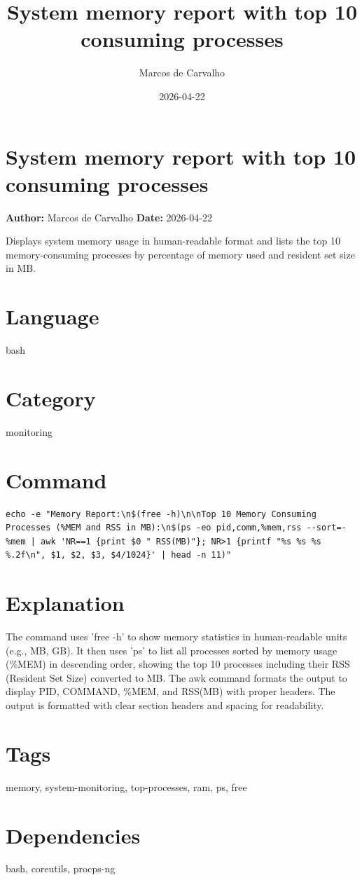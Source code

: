 \documentclass{article}
\title{System memory report with top 10 consuming processes}
\author{Marcos de Carvalho}
\date{2026-04-22}
\begin{document}
\section*{System memory report with top 10 consuming processes}
\textbf{Author:} Marcos de Carvalho \hfill \textbf{Date:} 2026-04-22

\noindent Displays system memory usage in human-readable format and lists the top 10 memory-consuming processes by percentage of memory used and resident set size in MB.

\section*{Language}
bash

\section*{Category}
monitoring

\section*{Command}
\begin{lstlisting}
echo -e "Memory Report:\n$(free -h)\n\nTop 10 Memory Consuming Processes (%MEM and RSS in MB):\n$(ps -eo pid,comm,%mem,rss --sort=-%mem | awk 'NR==1 {print $0 " RSS(MB)"}; NR>1 {printf "%s %s %s %.2f\n", $1, $2, $3, $4/1024}' | head -n 11)"
\end{lstlisting}

\section*{Explanation}
The command uses 'free -h' to show memory statistics in human-readable units (e.g., MB, GB). It then uses 'ps' to list all processes sorted by memory usage (\%MEM) in descending order, showing the top 10 processes including their RSS (Resident Set Size) converted to MB. The awk command formats the output to display PID, COMMAND, \%MEM, and RSS(MB) with proper headers. The output is formatted with clear section headers and spacing for readability.

\section*{Tags}
memory, system-monitoring, top-processes, ram, ps, free

\section*{Dependencies}
bash, coreutils, procps-ng
\end{document}
